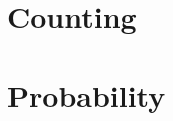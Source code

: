 \documentclass{mcs}
\begin{document}
\part{Counting}




\part{Probability}





\iffalse

not yet in book:



 (chernoff) %



equivalence relation section in binary relations

\fi



\end{document}

